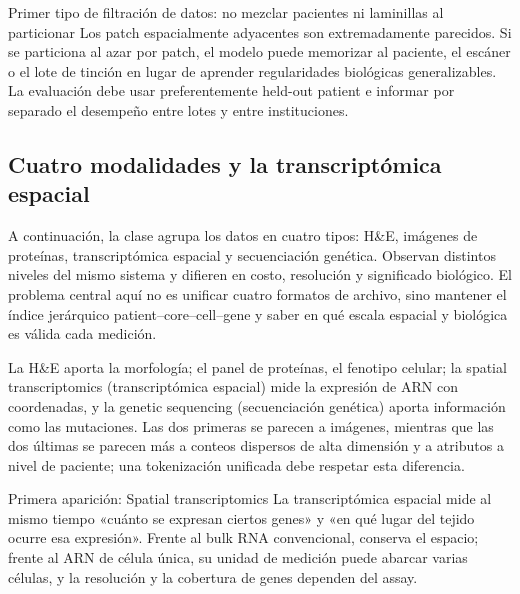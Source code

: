 \begin{warningbox}{Primer tipo de filtración de datos: no mezclar pacientes ni laminillas al particionar}
Los patch espacialmente adyacentes son extremadamente parecidos. Si se particiona al azar por patch, el modelo puede memorizar al paciente, el escáner o el lote de tinción en lugar de aprender regularidades biológicas generalizables. La evaluación debe usar preferentemente held-out patient e informar por separado el desempeño entre lotes y entre instituciones.
\end{warningbox}

\subsection{Cuatro modalidades y la transcriptómica espacial}

A continuación, la clase agrupa los datos en cuatro tipos: H\&E, imágenes de proteínas, transcriptómica espacial y secuenciación genética. Observan distintos niveles del mismo sistema y difieren en costo, resolución y significado biológico. El problema central aquí no es unificar cuatro formatos de archivo, sino mantener el índice jerárquico patient--core--cell--gene y saber en qué escala espacial y biológica es válida cada medición.


La H\&E aporta la morfología; el panel de proteínas, el fenotipo celular; la spatial transcriptomics (transcriptómica espacial) mide la expresión de ARN con coordenadas, y la genetic sequencing (secuenciación genética) aporta información como las mutaciones. Las dos primeras se parecen a imágenes, mientras que las dos últimas se parecen más a conteos dispersos de alta dimensión y a atributos a nivel de paciente; una tokenización unificada debe respetar esta diferencia.

\begin{knowledgebox}{Primera aparición: Spatial transcriptomics}
La transcriptómica espacial mide al mismo tiempo «cuánto se expresan ciertos genes» y «en qué lugar del tejido ocurre esa expresión». Frente al bulk RNA convencional, conserva el espacio; frente al ARN de célula única, su unidad de medición puede abarcar varias células, y la resolución y la cobertura de genes dependen del assay.
\end{knowledgebox}


